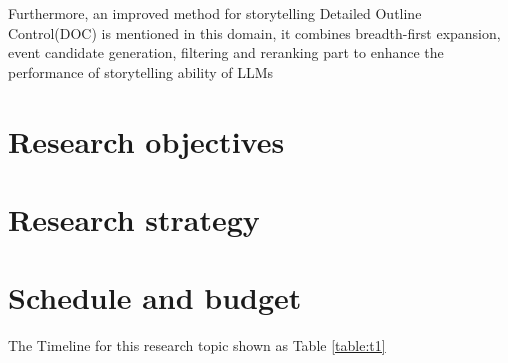\documentclass[10pt]{article}
\begin{document}
\begin{multicols}{2}
Furthermore, an improved method for storytelling Detailed Outline Control(DOC) is mentioned in this domain, it combines breadth-first expansion, event candidate generation, filtering and reranking part to enhance the performance of storytelling ability of LLMs\cite{yang-etal-2023-doc}


 

\section{Research objectives} 

	
\section{Research strategy}


\section{Schedule and budget}

The Timeline for this research topic shown as Table \ref{table:t1}


\end{multicols}
\end{document}
